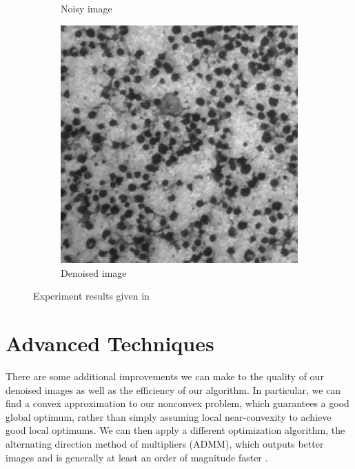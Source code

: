 \documentclass[11pt, oneside]{article}   	%
\begin{document}
\begin{figure}
\begin{subfigure}[b]{0.3\textwidth}
        \caption{Noisy image}
        \label{fig:noisy}
    \end{subfigure}
    \begin{subfigure}[b]{0.3\textwidth}
        \includegraphics[width=\textwidth]{figure/denoised}
        \caption{Denoised image}
        \label{fig:denoised}
    \end{subfigure}
    \caption{Experiment results given in \cite{rudin2003}}\label{fig:result}
\end{figure}

\section{Advanced Techniques}

There are some additional improvements we can make to the quality of our
denoised images as well as the efficiency of our algorithm. In particular, we
can find a convex approximation to our nonconvex problem, which guarantees a
good global optimum, rather than simply assuming local near-convexity to achieve
good local optimums. We can then apply a different optimization algorithm, the
alternating direction method of multipliers (ADMM), which outputs better images
and is generally at least an order of magnitude faster \cite{wang2013fast}.
\end{document}
